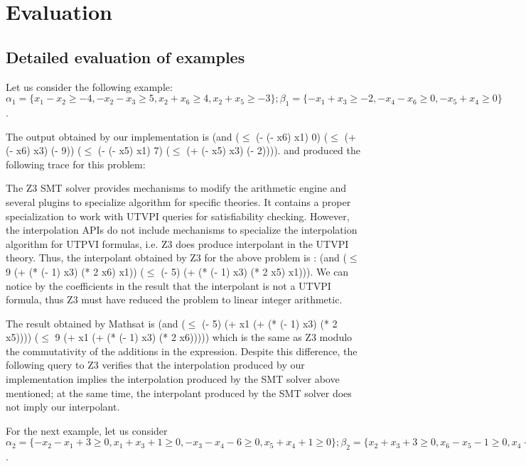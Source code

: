 \section{Evaluation}

\subsection{Detailed evaluation of examples}

Let us consider the following example:
$\alpha_1 = \{x_1 - x_2 \geq -4, -x_2 - x_3 \geq 5, 
  x_2 + x_6 \geq 4, x_2 + x_5 \geq -3\}; 
\beta_1 = \{-x_1 + x_3 \geq -2, -x_4 - x_6 \geq 0, -x_5 + x_4 \geq 0\}$. 

The output obtained by our implementation is
(and ($\leq$ (- (- x6) x1) 0)
($\leq$ (+ (- x6) x3) (- 9))
($\leq$ (- (- x5) x1) 7)
($\leq$ (+ (- x5) x3) (- 2)))).
and produced the following trace
for this problem:



The Z3 SMT solver provides mechanisms to modify the arithmetic engine 
and several plugins to specialize algorithm for specific theories. It contains a
proper specialization to work with UTVPI queries for satisfiability checking. 
However,  the interpolation APIs do not include mechanisms to specialize the 
interpolation algorithm for UTPVI formulas, i.e. Z3 does produce interpolant
in the UTVPI theory.
Thus, the interpolant obtained by Z3 for the above problem is : 
(and ($\leq$ 9 (+ (* (- 1) x3) (* 2 x6) x1)) ($\leq$ (- 5) (+ (* (- 1) x3) (* 2 x5) x1))).
We can notice by the coefficients in the result that the interpolant is not
a UTVPI formula, thus Z3 must have reduced the problem to linear integer arithmetic.

The result obtained by Mathsat is 
(and ($\leq$ (- 5) (+ x1 (+ (* (- 1) x3) (* 2 x5)))) ($\leq$ 9 (+ x1 (+ (* (- 1) x3) (* 2 x6))))) 
which is the same as Z3 modulo the commutativity of the
additions in the expression. Despite this difference, the following query 
to Z3 verifies that the interpolation produced by our implementation implies 
the interpolation produced by the SMT solver above mentioned; at the same time,
the interpolant produced by the SMT solver does not imply our interpolant.



For the next example, let us consider $\alpha_2 = \{
  -x_2 - x_1 + 3 \geq 0, 
  x_1 + x_3 + 1 \geq 0, 
  -x_3 - x_4 - 6 \geq 0, 
  x_5 + x_4 + 1 \geq 0 
\}; \beta_2 = \{
  x_2 + x_3 + 3 \geq 0,
  x_6 - x_5 - 1 \geq 0,
  x_4 - x_6 + 4 \geq 0
\}$. 

